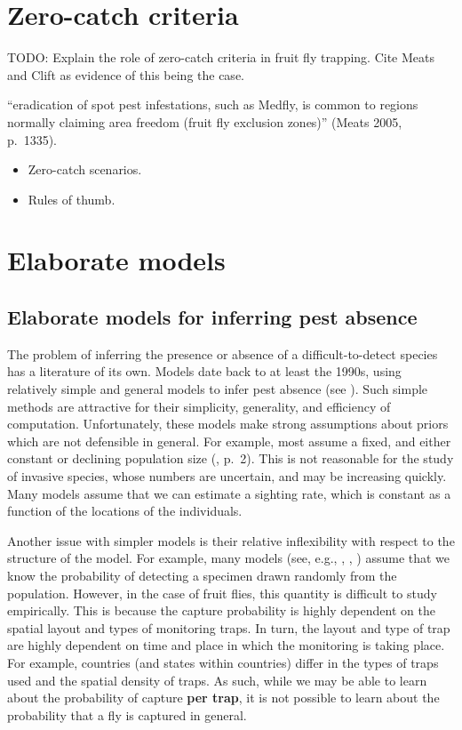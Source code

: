 \documentclass[
]{book}
\providecommand{\tightlist}{%
  \setlength{\itemsep}{0pt}\setlength{\parskip}{0pt}}
\begin{document}
\hypertarget{zero-catch-criteria}{%
\section{Zero-catch criteria}\label{zero-catch-criteria}}

TODO: Explain the role of zero-catch criteria in fruit fly trapping. Cite Meats and Clift as evidence of this being the case.

``eradication of spot pest infestations, such as Medfly, is common to regions normally claiming area freedom (fruit fly exclusion zones)'' (Meats 2005, p.~1335).

\begin{itemize}
\tightlist
\item
  Zero-catch scenarios.
\item
  Rules of thumb.
\end{itemize}

\hypertarget{elaborate-models}{%
\section{Elaborate models}\label{elaborate-models}}

\hypertarget{elaborate-models-for-inferring-pest-absence}{%
\subsection{Elaborate models for inferring pest absence}\label{elaborate-models-for-inferring-pest-absence}}

The problem of inferring the presence or absence of a difficult-to-detect species has a literature of its own. Models date back to at least the 1990s, using relatively simple and general models to infer pest absence (see \citet{todocite}). Such simple methods are attractive for their simplicity, generality, and efficiency of computation. Unfortunately, these models make strong assumptions about priors which are not defensible in general. For example, most assume a fixed, and either constant or declining population size (\citet{caley2015}, p.~2). This is not reasonable for the study of invasive species, whose numbers are uncertain, and may be increasing quickly. Many models assume that we can estimate a sighting rate, which is constant as a function of the locations of the individuals.

Another issue with simpler models is their relative inflexibility with respect to the structure of the model. For example, many models (see, e.g., \citet{mcardle}, \citet{barnes}, \citet{boakes}) assume that we know the probability of detecting a specimen drawn randomly from the population. However, in the case of fruit flies, this quantity is difficult to study empirically. This is because the capture probability is highly dependent on the spatial layout and types of monitoring traps. In turn, the layout and type of trap are highly dependent on time and place in which the monitoring is taking place. For example, countries (and states within countries) differ in the types of traps used and the spatial density of traps. As such, while we may be able to learn about the probability of capture \textbf{per trap}, it is not possible to learn about the probability that a fly is captured in general.
\end{document}
